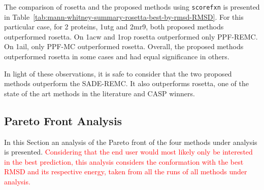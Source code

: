 The comparison of rosetta and the proposed methods using \texttt{scorefxn}
is presented in Table~\ref{tab:mann-whitney-summary-rosetta-best-by-rmsd-RMSD}.
For this particular case, for 2 proteins, 1utg and 2mr9, both proposed
methods outperformed rosetta. On 1acw and 1rop rosetta outperformed only
PPF-REMC. On 1ail, only PPF-MC outperformed rosetta. Overall,
the proposed methods outperformed rosetta in some cases and had equal
significance in others.

In light of these observations, it is safe to consider that the two proposed
methods outperform the SADE-REMC. It also outperforms rosetta, one of
the state of the art methods in the literature and CASP winners.

\subsection{Pareto Front Analysis}\label{sec:pareto-front-analysis}

In this Section an analysis of the Pareto front of the four methods under
analysis is presented.
\textcolor{red}{
Considering that the end user would most likely only be
interested in the best prediction, this analysis considers the conformation with
the best RMSD and its respective energy, taken from all the runs of all methods under
analysis.
}

